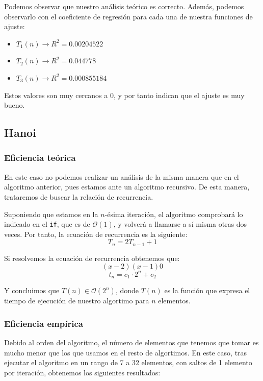 \documentclass[10pt,a4paper]{article}
\begin{document}
Podemos observar que nuestro análisis teórico es correcto. Además, podemos observarlo con el coeficiente de regresión para cada una de nuestra funciones de ajuste:
\begin{itemize}
	\item \(T_1(n) \longrightarrow R^2 = 0.00204522\)
	\item \(T_2(n) \longrightarrow R^2 = 0.044778\)
	\item \(T_3(n) \longrightarrow R^2 = 0.000855184\)
\end{itemize}

Estos valores son muy cercanos a 0, y por tanto indican que el ajuste es muy bueno.
\subsection{Hanoi}


\subsubsection{Eficiencia teórica}

En este caso no podemos realizar un análisis de la misma manera que en el algoritmo anterior, pues estamos ante un algoritmo recursivo. De esta manera, trataremos de buscar la relación de recurrencia.

Suponiendo que estamos en la \(n\)-ésima iteración, el algoritmo comprobará lo indicado en el \texttt{if}, que es de \(\mathcal{O}(1)\), y volverá a llamarse a sí misma otras dos veces. Por tanto, la ecuación de recurrencia es la siguiente:
\[
	T_n = 2T_{n-1} + 1
\]

Si resolvemos la ecuación de recurrencia obtenemos que:
\[
	(x-2)(x-1) 0
\]
\[
	t_n = c_1 \cdot 2^n + c_2
\]

Y concluimos que \(T(n) \in \mathcal{O}(2^n)\), donde \(T(n)\) es la función que expresa el tiempo de ejecución de nuestro algortimo para \(n\) elementos.

\subsubsection{Eficiencia empírica}
Debido al orden del algoritmo, el número de elementos que tenemos que tomar es mucho menor que los que usamos en el resto de algortimos. En este caso, tras ejecutar el algoritmo en un rango de 7 a 32 elementos, con saltos de 1 elemento por iteración, obtenemos los siguientes resultados:
\end{document}
